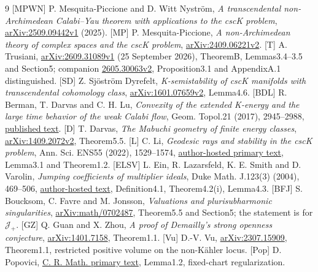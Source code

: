\documentclass[11pt]{article}
\newcommand{\J}{\mathcal J}
\begin{document}
\begin{thebibliography}{9}
[MPWN] P. Mesquita-Piccione and D. Witt Nystr\"om,
\emph{A transcendental non-Archimedean Calabi--Yau theorem with
applications to the cscK problem},
\href{https://arxiv.org/pdf/2509.09442v1}{arXiv:2509.09442v1} (2025).
[MP] P. Mesquita-Piccione,
\emph{A non-Archimedean theory of complex spaces and the cscK problem},
\href{https://arxiv.org/pdf/2409.06221v2}{arXiv:2409.06221v2}.
[T] A. Trusiani,
\href{https://arxiv.org/pdf/2609.31089v1}{arXiv:2609.31089v1}
(25 September 2026), TheoremB, Lemmas3.4--3.5 and Section5;
companion \href{https://arxiv.org/pdf/2605.30063v2}{2605.30063v2},
Proposition3.1 and AppendixA.1 distinguished.
[SD] Z. Sj\"ostr\"om Dyrefelt,
\emph{K-semistability of cscK manifolds with transcendental
cohomology class},
\href{https://arxiv.org/pdf/1601.07659v2}{arXiv:1601.07659v2}, Lemma4.6.
[BDL] R. Berman, T. Darvas and C. H. Lu,
\emph{Convexity of the extended K-energy and the large time behavior
of the weak Calabi flow}, Geom. Topol.21 (2017), 2945--2988,
\href{https://msp.org/gt/2017/21-5/gt-v21-n5-p08-s.pdf}{published text}.
[D] T. Darvas,
\emph{The Mabuchi geometry of finite energy classes},
\href{https://arxiv.org/pdf/1409.2072v2}{arXiv:1409.2072v2}, Theorem5.5.
[L] C. Li, \emph{Geodesic rays and stability in the cscK
problem}, Ann. Sci. ENS55 (2022), 1529--1574,
\href{https://sites.math.rutgers.edu/~cl1412/papers/maximal.pdf}
{author-hosted primary text}, Lemma3.1 and Theorem1.2.
[ELSV] L. Ein, R. Lazarsfeld, K. E. Smith and D. Varolin,
\emph{Jumping coefficients of multiplier ideals}, Duke Math. J.123(3)
(2004), 469--506,
\href{https://www.math.stonybrook.edu/~dror/paper-jump.pdf}
{author-hosted text}, Definition4.1, Theorem4.2(i), Lemma4.3.
[BFJ] S. Boucksom, C. Favre and M. Jonsson,
\emph{Valuations and plurisubharmonic singularities},
\href{https://arxiv.org/pdf/math/0702487}{arXiv:math/0702487},
Theorem5.5 and Section5; the statement is for $\J_+$.
[GZ] Q. Guan and X. Zhou,
\emph{A proof of Demailly's strong openness conjecture},
\href{https://arxiv.org/pdf/1401.7158}{arXiv:1401.7158}, Theorem1.1.
[Vu] D.-V. Vu,
\href{https://arxiv.org/pdf/2307.15909}{arXiv:2307.15909}, Theorem1.1,
restricted positive volume on the non-K\"ahler locus.
[Pop] D. Popovici,
\href{https://comptes-rendus.academie-sciences.fr/mathematique/item/10.1016/j.crma.2003.11.011.pdf}
{C. R. Math. primary text}, Lemma1.2, fixed-chart regularization.
\end{thebibliography}
\end{document}
